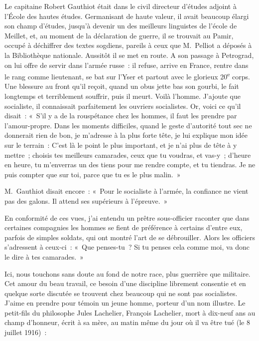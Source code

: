 \documentclass[french,twoside]{book} %
\begin{document}
Le capitaine Robert Gauthiot était dans le civil directeur d’études adjoint à l’École des hautes études. Germanisant de haute valeur, il avait beaucoup élargi son champ d’études, jusqu’à devenir un des meilleurs linguistes de l’école de Meillet, et, au moment de la déclaration de guerre, il se trouvait au Pamir, occupé à déchiffrer des textes sogdiens, pareils à ceux que M. Pelliot a déposés à la Bibliothèque nationale. Aussitôt il se met en route. A son passage à Petrograd, on lui offre de servir dans l’armée russe : il refuse, arrive en France, rentre dans le rang comme lieutenant, se bat sur l’Yser et partout avec le glorieux 20\textsuperscript{e} corps. Une blessure au front qu’il reçoit, quand un obus jette bas son gourbi, le fait longtemps et terriblement souffrir, puis il meurt. Voilà l’homme. J’ajoute que socialiste, il connaissait parfaitement les ouvriers socialistes. Or, voici ce qu’il disait : « S’il y a de la rouspétance chez les hommes, il faut les prendre par l’amour-propre. Dans les moments difficiles, quand le geste d’autorité tout sec ne donnerait rien de bon, je m’adresse à la plus forte tête, je lui explique mon idée sur le terrain : C’est là le point le plus important, et je n’ai plus de tête à y mettre ; choisis tes meilleurs camarades, ceux que tu voudras, et vas-y ; d’heure en heure, tu m’enverras un des tiens pour me rendre compte, et tu tiendras. Je ne puis compter que sur toi, parce que tu es le plus malin. »‌\par
M. Gauthiot disait encore : « Pour le socialiste à l’armée, la confiance ne vient pas des galons. Il attend ses supérieurs à l’épreuve. »‌\par
En conformité de ces vues, j’ai entendu un prêtre sous-officier raconter que dans certaines compagnies les hommes se fient de préférence à certains d’entre eux, parfois de simples soldats, qui ont montré l’art de se débrouiller. Alors les officiers s’adressent à ceux-ci : « Que penses-tu ? Si tu penses cela comme moi, va donc le dire à tes camarades. »‌\par
Ici, nous touchons sans doute au fond de notre race, plus guerrière que militaire. Cet amour du beau travail, ce besoin d’une discipline librement consentie et en quelque sorte discutée se trouvent chez beaucoup qui ne sont pas socialistes. J’aime en prendre pour témoin un jeune homme, porteur d’un nom illustre. Le petit-fils du philosophe Jules Lachelier, François Lachelier, mort à dix-neuf ans au champ d’honneur, écrit à sa mère, au matin même du jour où il va être tué (le 8 juillet 1916) :‌\par
\end{document}
